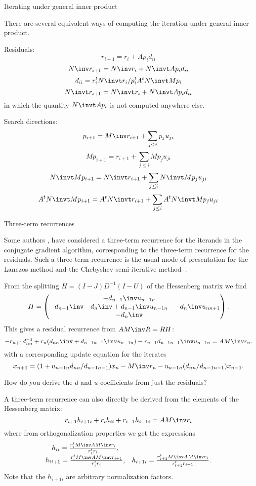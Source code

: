 \documentclass[11pt]{artikel3}
\begin{document}
\begin{Outline}
 {Iterating under general inner product}

There are several equivalent ways of computing the iteration
under general inner product.

Residuals:
\[ r_{i+1} = r_i+Ap_id_{ii}\]
\[ N\inv r_{i+1} = N\inv r_i+N\invt Ap_id_{ii} \]
\[ d_{ii} = r_i^tN\invt r_i/p_i^tA^tN\invt Mp_i \]
\[ N\invt r_{i+1} = N\invt r_i+N\invt Ap_id_{ii} \]
in which the quantity $N\invt Ap_i$ is not computed anywhere else.

Search directions:
\[ p_{i+1} = M\inv r_{i+1}+\sum_{j\leq i}p_ju_{ji} \]
\[ Mp_{i+1} = r_{i+1}+\sum_{j\leq i}M p_ju_{ji} \]
\[ N\invt Mp_{i+1} = N\invt r_{i+1}+\sum_{j\leq i}N\invt Mp_ju_{ji} \]
\[ A^tN\invt Mp_{i+1} = A^tN\invt r_{i+1}+\sum_{j\leq i}A^tN\invt Mp_ju_{ji} \]

 {Three-term recurrences}
        \label{sec:three-term}

Some authors \cite{EnGiRuSt:refined,HaYo:applied}, have considered
a three-term recurrence for the iterands in the conjugate gradient
algorithm, corresponding to the three-term recurrence for the
residuals. Such a three-term recurrence is the usual mode of
presentation for the Lanczos method and the Chebyshev semi-iterative
method~\cite{HaYo:applied}. 

From the splitting $H=(I-J)D^{-1}(I-U)$ of the Hessenberg matrix 
we find
\[ H=\begin{pmatrix}&-d_{n-1}\inv u_{n-1n}\cr
    -d_{n-1}\inv&d_n\inv+d_{n-1}\inv u_{n-1n}&-d_n\inv u_{nn+1}\cr
    &-d_n\inv \end{pmatrix}. \]
This gives a residual recurrence from $AM\inv R=RH$:
\begin{equation}
        -r_{n+1}d_{nn}^{-1}+r_n(d_{nn}\inv+d_{n-1n-1}\inv u_{n-1n})
        -r_{n-1}d_{n-1n-1}\inv u_{n-1n}=AM\inv r_n.
        \label{eq:three-term:H}\end{equation}
with a corresponding update equation for the iterates
\[ x_{n+1}=(1+u_{n-1n}d_{nn}/d_{n-1n-1})x_n-M\inv r_n
        -u_{n-1n}(d_{nn}/d_{n-1n-1})x_{n-1}. \]

\begin{question}
How do you derive the $d$ and $u$ coefficients from just the residuals?
\end{question}

A three-term recurrence can also directly be derived from the elements
of the Hessenberg matrix:
\begin{equation}
        r_{i+1}h_{i+1i} + r_ih_{ii} + r_{i-1}h_{i-1i} = AM\inv r_i
        \label{eq:three-term}\end{equation}
where from orthogonalization properties we get the expressions
\begin{equation}
\begin{matrix}h_{ii}={r_i^tM\inv AM\inv r_i\over r_i^tr_i},\cr
    h_{ii+1}={r_i^tM\inv AM\inv r_{i+1}\over r_i^tr_i},&
    h_{i+1i}={r_{i+1}^tM\inv AM\inv r_i\over r_{i+1}^tr_{i+1}}.\end{matrix}
        \label{three-term:h:formulas}\end{equation}
Note that the $h_{i+1i}$ are arbitrary normalization factors.


\end{Outline}
\end{document}
